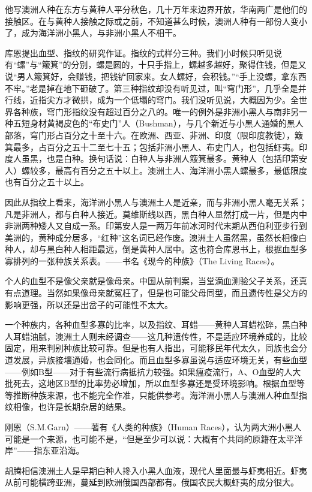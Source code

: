 \par 他写澳洲人种在东方与黄种人平分秋色，几十万年来边界开放，华南两广是他们的接触区。在与黄种人接触之际或之前，不知道甚么时候，澳洲人种有一部份人变小了，成为海洋洲小黑人，与非洲小黑人不相干。
\par 库恩提出血型、指纹的研究作证。指纹的式样分三种。我们小时候只听见说有“螺”与“簸箕”的分别，螺是圆的，十只手指上，螺越多越好，聚得住钱，但是又说“男人簸箕好，会赚钱，把钱铲回家来。女人螺好，会积钱。”“手上没螺，拿东西不牢。”老是掉在地下砸破了。第三种指纹却没有听见过，叫“穹门形”，几乎全是并行线，近指尖方才微拱，成为一个低塌的穹门。我们没听见说，大概因为少。全世界各种族，穹门形指纹没有超过百分之八的。唯一的例外是非洲小黑人与南非另一种五短身材黄褐皮色的“布史门”人（Bushman），与几个新近与小黑人通婚的黑人部落，穹门形占百分之十至十六。在欧洲、西亚、非洲、印度（限印度教徒），簸箕最多，占百分之五十二至七十五；包括非洲小黑人、布史门人，也包括虾夷。印度人虽黑，也是白种。换句话说：白种人与非洲人簸箕最多。黄种人（包括印第安人）螺较多，最高有百分之五十以上。澳洲土人、海洋洲小黑人螺最多，最低限度也有百分之五十以上。
\par 因此从指纹上看来，海洋洲小黑人与澳洲土人是近亲，而与非洲小黑人毫无关系；凡是非洲人，都与白种人接近。莫维斯线以西，黑白种人显然打成一片，但是内中非洲两种矮人又自成一系。印第安人是一两万年前冰河时代末期从西伯利亚步行到美洲的，黄种成分居多，“红种”这名词已经作废。澳洲土人虽然黑，虽然长相像白种人，却与黑白种人相距最远，倒是黄种人居中。这也符合库恩书上，根据血型多寡排列的一张种族关系表。——书名《现今的种族》（The Living Races）。
\par 个人的血型不是像父亲就是像母亲。中国从前判案，当堂滴血测验父子关系，还真有点道理。当然如果像母亲就冤枉了，但是也可能父母同型，而且遗传性是父方的影响更强，所以还是出岔子的可能性不太大。
\par 一个种族内，各种血型多寡的比率，以及指纹、耳蜡——黄种人耳蜡松碎，黑白种人耳蜡油腻，澳洲土人则未经调查——这几种遗传性，不是适应环境养成的，比较固定，用来判别种族比较可靠。但是也有人指出，可能移民年代太久，同族也会分道发展，异族接壤通婚，也会同化。而且血型多寡虽说与适应环境无关，有些血型——例如B型——对于有些流行病抵抗力较强。如果瘟疫流行，A、O血型的人大批死去，这地区B型的比率势必增加，所以血型多寡还是受环境影响。根据血型等等推断种族来源，也不能完全作准，只能供参考。海洋洲小黑人与澳洲人种血型指纹相像，也许是长期杂居的结果。
\par 刚恩（S.M.Garn）——著有《人类的种族》（Human Races），认为两大洲小黑人可能是一个来源，也可能不是，“但是至少可以说：大概有个共同的原籍在太平洋岸”——指东亚沿海。
\par 胡腾相信澳洲土人是早期白种人搀入小黑人血液，现代人里面最与虾夷相近。虾夷从前可能横跨亚洲，蔓延到欧洲俄国西部都有。俄国农民大概虾夷的成分很大。
